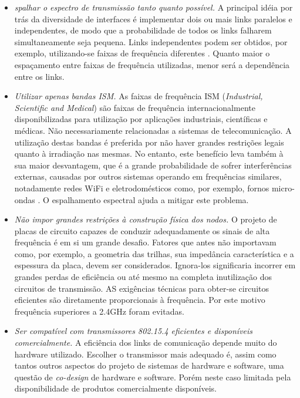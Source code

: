 \documentclass[
	12pt,				%
	openright,			%
	oneside,
	a4paper,			%
	english,			%
	french,				%
	spanish,			%
	brazil				%
	]{abntex2}
\begin{document}
\begin{itemize}
	\item \textit{spalhar o espectro de transmissão tanto quanto possível.} A principal idéia por trás da diversidade de interfaces é implementar dois ou mais links paralelos e independentes, de modo que a probabilidade de todos os links falharem simultaneamente seja pequena. Links independentes podem ser obtidos, por exemplo, utilizando-se faixas de frequência diferentes \cite{Kusy2011}. Quanto maior o espaçamento entre faixas de frequência utilizadas, menor será a dependência entre os links.
	\item \textit{Utilizar apenas bandas ISM.} As faixas de frequência ISM (\textit{Industrial, Scientific and Medical}) são faixas de frequência internacionalmente disponibilizadas para utilização por aplicações industriais, científicas e médicas. Não necessariamente relacionadas a sistemas de telecomunicação. A utilização destas bandas é preferida por não haver grandes restrições legais quanto à irradiação nas mesmas. No entanto, este benefício leva também à sua maior desvantagem, que é a grande probabilidade de sofrer interferências externas, causadas por outros sistemas operando em frequências similares, notadamente redes WiFi e eletrodomésticos como, por exemplo, fornos micro-ondas \cite{Kusy2011, Srinivasan2008}. O espalhamento espectral ajuda a mitigar este problema.
	\item \textit{Não impor grandes restrições à construção física dos nodos.} O projeto de placas de circuito capazes de conduzir adequadamente os sinais de alta frequência é em si um grande desafio. Fatores que antes não importavam como, por exemplo, a geometria das trilhas, sua impedância característica e a espessura da placa, devem ser considerados. Ignora-los significaria incorrer em grandes perdas de eficiência ou até mesmo na completa inutilização dos circuitos de transmissão. AS exigências técnicas para obter-se circuitos eficientes são diretamente proporcionais à frequência. Por este motivo frequência superiores a 2.4GHz foram evitadas.
	\item \textit{Ser compatível com transmissores 802.15.4 eficientes e disponíveis comercialmente.} A eficiência dos links de comunicação depende muito do hardware utilizado. Escolher o transmissor mais adequado é, assim como tantos outros aspectos do projeto de sistemas de hardware e software, uma questão de \textit{co-design} de hardware e software. Porém neste caso limitada pela disponibilidade de produtos comercialmente disponíveis.
\end{itemize}
\end{document}
